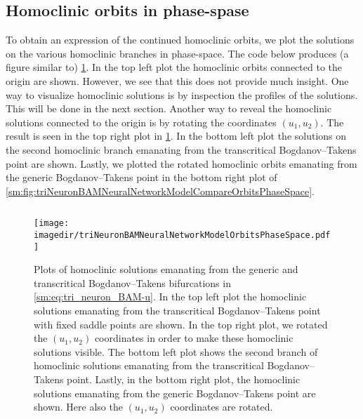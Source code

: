 \subsection{Homoclinic orbits in phase-spase}
To obtain an expression of the continued homoclinic orbits,
we plot the solutions on the various homoclinic branches in phase-space.
The code below produces (a figure similar to)
\cref{sm:fig:triNeuronBAMNeuralNetworkModelOrbitsPhaseSpace}.
In the top left plot the homoclinic orbits connected to the origin are shown. However,
we see that this does not provide much insight. 
One way to visualize homoclinic solutions is by inspection the
profiles of the solutions. This will be done in the next section.
Another way to reveal the homoclinic solutions connected to the origin is by
rotating the coordinates $(u_1,u_2)$. The result is seen in the top right
plot in \cref{sm:fig:triNeuronBAMNeuralNetworkModelOrbitsPhaseSpace}.
In the bottom left plot the solutions on the second homoclinic branch emanating
from the transcritical Bogdanov--Takens point are shown. Lastly, we plotted the
rotated homoclinic orbits emanating from the generic
Bogdanov--Takens point in the bottom right plot of
\cref{sm:fig:triNeuronBAMNeuralNetworkModelCompareOrbitsPhaseSpace}.
\inputminted[firstline=269, lastline=335]{MATLAB}{\pathToDDEBifToolDemos/BAM_neural_network_model/BAMnn.m}
\begin{figure}[ht!]
    \texttt{[image: \\imagedir/triNeuronBAMNeuralNetworkModelOrbitsPhaseSpace.pdf]}
    \caption{
    Plots of homoclinic solutions emanating from the generic and transcritical
    Bogdanov--Takens bifurcations in \cref{sm:eq:tri_neuron_BAM-u}. In the top
    left plot the homoclinic solutions emanating from the transcritical
    Bogdanov--Takens point with fixed saddle points are shown. In the top right
    plot, we rotated the $(u_1, u_2)$ coordinates in order to make these
    homoclinic solutions visible. The bottom left plot shows the second branch
    of homoclinic solutions emanating from the transcritical Bogdanov--Takens
    point. Lastly, in the bottom right plot, the homoclinic solutions emanating
    from the generic Bogdanov--Takens point are shown. Here also the $(u_1,
    u_2)$ coordinates are rotated.
    }
    \label{sm:fig:triNeuronBAMNeuralNetworkModelOrbitsPhaseSpace}
\end{figure}


